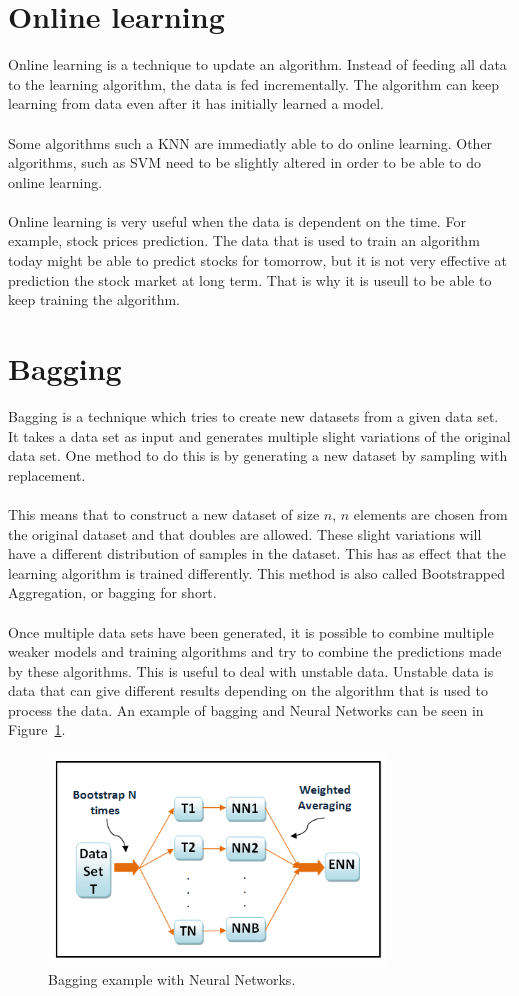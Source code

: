 \section{Online learning}
Online learning is a technique to update an algorithm. Instead of feeding all data to the learning algorithm, the data is fed incrementally. The algorithm can keep learning from data even after it has initially learned a model. \\\\
Some algorithms such a KNN are immediatly able to do online learning. Other algorithms, such as SVM need to be slightly altered in order to be able to do online learning. \\\\
Online learning is very useful when the data is dependent on the time. For example, stock prices prediction. The data that is used to train an algorithm today might be able to predict stocks for tomorrow, but it is not very effective at prediction the stock market at long term. That is why it is useull to be able to keep training the algorithm. \cite{onlineLearning}

\section{Bagging}
Bagging is a technique which tries to create new datasets from a given data set. It takes a data set as input and generates multiple slight variations of the original data set. One method to do this is by generating a new dataset by sampling with replacement. \\
\\
This means that to construct a new dataset of size $n$, $n$ elements are chosen from the original dataset and that doubles are allowed. These slight variations will have a different distribution of samples in the dataset. This has as effect that the learning algorithm is trained differently. This method is also called Bootstrapped Aggregation, or bagging for short. \\
\\
Once multiple data sets have been generated, it is possible to combine multiple weaker models and training algorithms and try to combine the predictions made by these algorithms. This is useful to deal with unstable data. Unstable data is data that can give different results depending on the algorithm that is used to process the data. An example of bagging and Neural Networks can be seen in Figure~\ref{fig:baggingExample}. \cite{mlcat}

\begin{figure}[H]
\centering
\includegraphics[width=0.8\textwidth]{Figures/bagging}
\decoRule
\caption[Bagging example with Neural Networks]{Bagging example with Neural Networks. \cite{baggingExample}}
\label{fig:baggingExample}
\end{figure}
